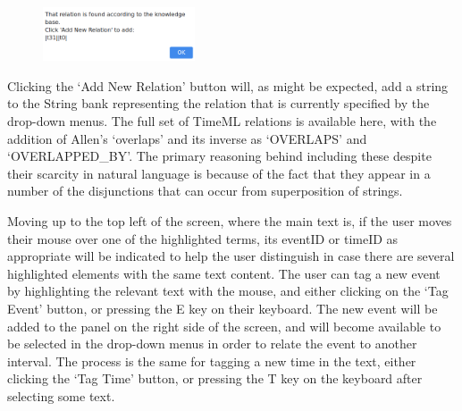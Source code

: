 \documentclass[a4paper,12pt,leqno]{article}
\begin{document}
\begin{center}
	\begin{figure}[h!]
		\centering
		\includegraphics[width=0.4\textwidth]{images/START-test-2.png}
	\end{figure}
\end{center}
Clicking the `Add New Relation' button will, as might be expected, add a string to the String bank representing the relation that is currently specified by the drop-down menus. The full set of TimeML relations is available here, with the addition of Allen's `overlaps' and its inverse as `OVERLAPS' and `OVERLAPPED\_BY'. The primary reasoning behind including these despite their scarcity in natural language is because of the fact that they appear in a number of the disjunctions that can occur from superposition of strings.

Moving up to the top left of the screen, where the main text is, if the user moves their mouse over one of the highlighted terms, its eventID or timeID as appropriate will be indicated to help the user distinguish in case there are several highlighted elements with the same text content. The user can tag a new event by highlighting the relevant text with the mouse, and either clicking on the `Tag Event' button, or pressing the E key on their keyboard. The new event will be added to the panel on the right side of the screen, and will become available to be selected in the drop-down menus in order to relate the event to another interval. The process is the same for tagging a new time in the text, either clicking the `Tag Time' button, or pressing the T key on the keyboard after selecting some text.
\end{document}

